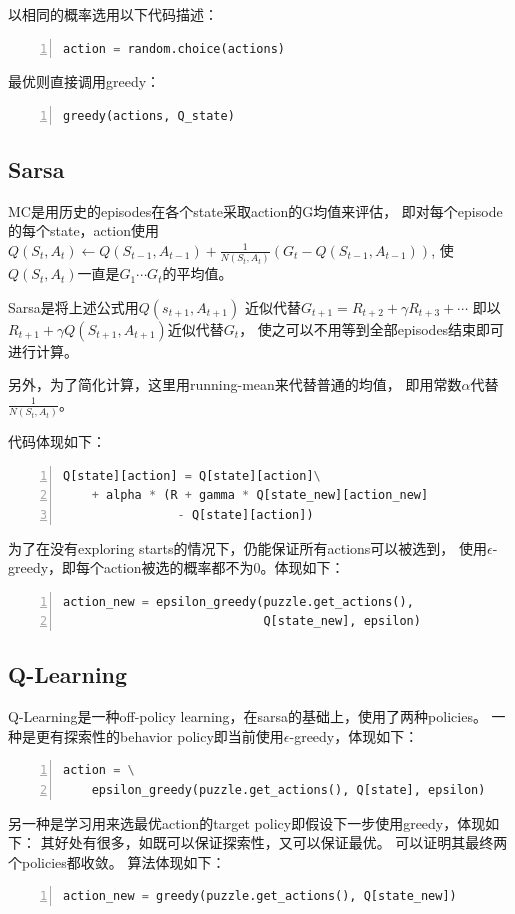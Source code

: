 \documentclass[a4paper, 11pt]{article}
\begin{document}
以相同的概率选用以下代码描述：

\begin{lstlisting}[frame=single,language=python,numbers=left]
action = random.choice(actions)
\end{lstlisting}

最优则直接调用greedy：

\begin{lstlisting}[frame=single,language=python,numbers=left]
greedy(actions, Q_state)
\end{lstlisting}

\subsection{Sarsa}

MC是用历史的episodes在各个state采取action的G均值来评估，
即对每个episode的每个state，action使用
$Q(S_t,A_t)\leftarrow Q(S_{t-1},A_{t-1})+\frac1{N(S_t,A_t)}(G_t-Q(S_{t-1},A_{t-1}))$,
使$Q(S_t,A_t)$一直是$G_1\cdots G_t$的平均值。

Sarsa是将上述公式用$Q(s_{t+1},A_{t+1})$
近似代替$G_{t+1}=R_{t+2}+\gamma R_{t+3}+\cdots$
即以$R_{t+1}+\gamma Q(S_{t+1},A_{t+1})$近似代替$G_t$，
使之可以不用等到全部episodes结束即可进行计算。

另外，为了简化计算，这里用running-mean来代替普通的均值，
即用常数$\alpha$代替$\frac1{N(S_t,A_t)}$。

代码体现如下：

\begin{lstlisting}[frame=single,language=python,numbers=left]
Q[state][action] = Q[state][action]\
    + alpha * (R + gamma * Q[state_new][action_new]
                - Q[state][action])
\end{lstlisting}

为了在没有exploring starts的情况下，仍能保证所有actions可以被选到，
使用$\epsilon$-greedy，即每个action被选的概率都不为0。体现如下：

\begin{lstlisting}[frame=single,language=python,numbers=left]
action_new = epsilon_greedy(puzzle.get_actions(),
                            Q[state_new], epsilon)
\end{lstlisting}

\subsection{Q-Learning}

Q-Learning是一种off-policy learning，在sarsa的基础上，使用了两种policies。
一种是更有探索性的behavior policy即当前使用$\epsilon$-greedy，体现如下：
\begin{lstlisting}[frame=single,language=python,numbers=left]
action = \
    epsilon_greedy(puzzle.get_actions(), Q[state], epsilon)
\end{lstlisting}
另一种是学习用来选最优action的target policy即假设下一步使用greedy，体现如下：
其好处有很多，如既可以保证探索性，又可以保证最优。
可以证明其最终两个policies都收敛。
算法体现如下：
\begin{lstlisting}[frame=single,language=python,numbers=left]
action_new = greedy(puzzle.get_actions(), Q[state_new])
\end{lstlisting}
\end{document}
